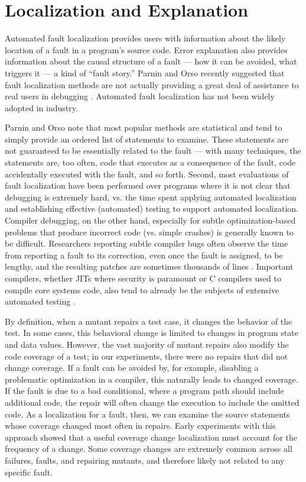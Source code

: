\section{Localization and Explanation}

Automated fault localization \cite{FaultSurvey,Jones2002} provides users with
information about the likely location of a fault in a program's source
code.  Error explanation \cite{GroceError} also provides information
about the causal structure of a fault --- how it can be avoided, what
triggers it --- a kind of ``fault story.''  Parnin and Orso recently
suggested that fault localization methods are not actually providing a
great deal of assistance to real users in debugging \cite{AutoHelp}.
Automated fault localization has not been widely adopted in industry.

Parnin and Orso note that most popular methods are
statistical and tend to simply provide an ordered list of statements
to examine.  These statements are not guaranteed to be essentially
related to the fault --- with many techniques, the statements are,
too often, code that executes as a consequence of the fault, code
accidentally executed with the fault, and so forth.  Second, most
evaluations of fault localization have been performed over programs
where it is not clear that debugging is extremely hard, vs. the time
spent applying automated localization and establishing effective
(automated) testing to support automated localization.  Compiler
debugging, on the other hand, especially for subtle optimization-based
problems that produce incorrect code (vs. simple crashes) is generally
known to be difficult.
Researchers reporting subtle compiler bugs often observe the time from
reporting a fault to its correction, even once the fault is assigned,
to be lengthy, and the resulting patches are sometimes thousands of
lines \cite{PLDI13}.  Important compilers, whether JITs where security is paramount
or C compilers used to compile core systems code, also tend to already
be the
subjects of extensive automated testing \cite{jsfunfuzz,csmith}.

By definition, when a mutant repairs a test case, it changes the
behavior of the test.  In some cases, this behavioral change is
limited to changes in program state and data values.  However, the
vast majority of mutant repairs also modify the code coverage of a
test; in our experiments, there were no repairs that did not change
coverage.  If a fault can be avoided by, for example, disabling a
problematic optimization in a compiler, this naturally leads to
changed coverage.  If the fault is due to a bad conditional, where a
program path should include additional code, the repair will often
change the execution to include the omitted code.  As a localization
for a fault, then, we can examine the source statements whose
  coverage changed most often in repairs.  Early experiments with this
  approach showed that a useful coverage change localization must  account for the frequency of a
change.  Some coverage changes are extremely common across all
failures, faults, and repairing mutants,
and therefore likely not related to any specific fault.

